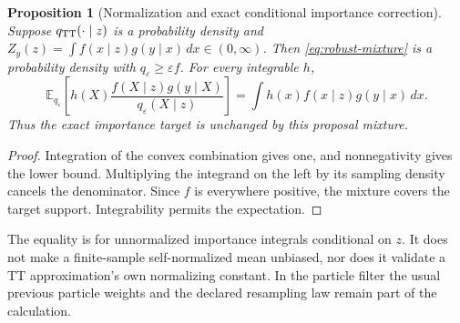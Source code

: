 \documentclass[11pt]{article}
\newtheorem{proposition}{Proposition}
\begin{document}
\begin{proposition}[Normalization and exact conditional importance correction]
\label{prop:robust-mixture-correction}
Suppose $q_{\rm TT}(\cdot\mid z)$ is a probability density and
$Z_y(z)=\int f(x\mid z)g(y\mid x)\,dx\in(0,\infty)$.
Then \eqref{eq:robust-mixture} is a probability density with
$q_\varepsilon\ge\varepsilon f$. For every integrable $h$,
\begin{equation}
 \mathbb E_{q_\varepsilon}\!\left[
 h(X)\frac{f(X\mid z)g(y\mid X)}{q_\varepsilon(X\mid z)}\right]
 =\int h(x)f(x\mid z)g(y\mid x)\,dx .
 \label{eq:robust-importance}
\end{equation}
Thus the exact importance target is unchanged by this proposal mixture.
\end{proposition}
\begin{proof}
Integration of the convex combination gives one, and nonnegativity gives
the lower bound. Multiplying the integrand on the left by its sampling
density cancels the denominator. Since $f$ is everywhere positive, the
mixture covers the target support. Integrability permits the expectation.
\end{proof}

The equality is for unnormalized importance integrals conditional on $z$.
It does not make a finite-sample self-normalized mean unbiased, nor does it
validate a TT approximation's own normalizing constant. In the particle
filter the usual previous particle weights and the declared resampling law
remain part of the calculation.
\end{document}
